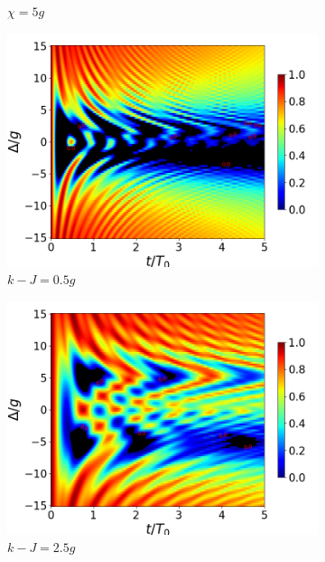 \begin{figure}[h]
\begin{subfigure}{0.49\textwidth}
        \caption{$\chi=5g$}
        \label{fig4:concu detunning 1 x2}
    \end{subfigure}
    \vfill
    \begin{subfigure}{0.49\textwidth}
        \includegraphics[width=\textwidth]{figuras/ch4/concu/delta/eg1+ge1 k=0.5g x=0.0g J=0.0g gamma=0.25g concu delta dis.png}
        \caption{$k-J=0.5g$}
        \label{fig4:concu detunning 1 k1}
    \end{subfigure}
    \hfill
    \begin{subfigure}{0.49\textwidth}
        \includegraphics[width=\textwidth]{figuras/ch4/concu/delta/eg1+ge1 k=2.5g x=0.0g J=0.0g gamma=0.25g concu delta dis.png}
        \caption{$k-J=2.5g$}
        \label{fig4:concu detunning 1 k2}
    \end{subfigure}
    \caption{}
    \label{fig4:concu detunning 1 params}
\end{figure}
